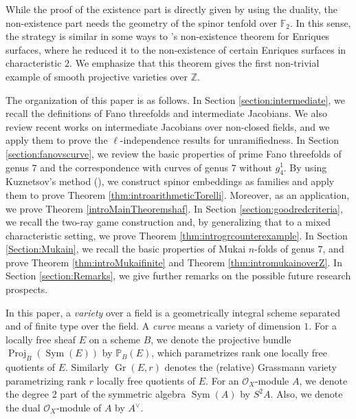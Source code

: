 \documentclass[autodetect-engine, a4paper]{amsart}
\theoremstyle{definition}
\def\F{{\mathbb F}}
\def\P{{\mathbb P}}
\def\Z{{\mathbb Z}}
\def\cO{\mathcal{O}}
\DeclareMathOperator\Sym{\mathrm{Sym}}
\DeclareMathOperator\Proj{\mathrm{Proj}}
\DeclareMathOperator\Gr{\mathrm{Gr}}
\begin{document}
While the proof of the existence part is directly given by using the duality, the non-existence part needs the geometry of the spinor tenfold over $\F_{2}$.
In this sense, the strategy is similar in some ways to \cite{Schroer}'s non-existence theorem for Enriques surfaces, where he reduced it to the non-existence of certain Enriques surfaces in characteristic $2$.
We emphasize that this theorem gives the first non-trivial example of smooth projective varieties over $\Z$.



The organization of this paper is as follows.
In Section \ref{section:intermediate}, we recall the definitions of Fano threefolds and intermediate Jacobians. We also review recent works on intermediate Jacobians over non-closed fields, and we apply them to prove the $\ell$-independence results for unramifiedness. 
In Section \ref{section:fanovscurve}, we review the basic properties of prime Fano threefolds of genus $7$ and the correspondence with curves of genus $7$ without $g_4^1$.
By using Kuznetsov's method (\cite{Kuznetsovfamily}), we construct spinor embeddings as families and apply them to prove Theorem \ref{thm:introarithmeticTorelli}.
Moreover, as an application, we prove Theorem \ref{introMainTheoremshaf}.
In Section \ref{section:goodredcriteria}, we recall the two-ray game construction and, by generalizing that to a mixed characteristic setting, we prove Theorem \ref{thm:introgrcounterexample}.
In Section \ref{Section:Mukain}, we recall the basic properties of Mukai $n$-folds of genus $7$, and prove  Theorem \ref{thm:introMukaifinite} and Theorem \ref{thm:intromukainoverZ}.
In Section \ref{section:Remarks}, we give further remarks on the possible future research prospects.

\medskip
{}
In this paper, a \emph{variety} over a field is a geometrically integral scheme separated and of finite type over the field.
A \emph{curve} means a variety of dimension $1$.
For a locally free sheaf $E$ on a scheme $B$,
we denote the projective bundle 
$
\Proj_{B} (\Sym (E))
$
by $\P_{B} (E)$, which parametrizes rank one locally free quotients of $E$.
Similarly $\Gr (E,r)$ denotes the (relative) Grassmann variety parametrizing rank $r$ locally free quotients of $E$. 
For an $\cO_{X}$-module $A$, we denote the degree 2 part of the symmetric algebra $\Sym (A)$ by $S^2 A$.
Also, we denote the dual $\cO_{X}$-module of $A$ by $A^{\vee}$.
\end{document}

